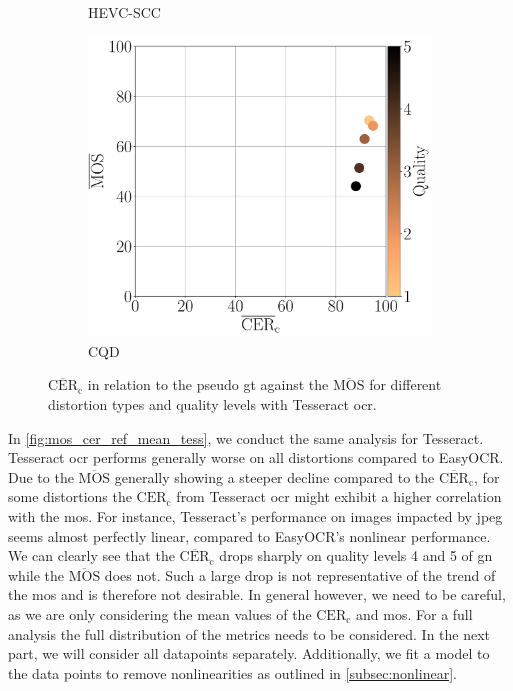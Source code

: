 \begin{figure}
\begin{subfigure}[b]{0.32\textwidth}
        \caption{HEVC-SCC}
        \label{fig:mos_cer_ref_mean_tess_HEVC-SCC}
    \end{subfigure}%
    \hfill
    \begin{subfigure}[b]{0.32\textwidth}
        \includegraphics[width=\textwidth]{../../images/analyze/mos_cer_ref_mean_tess_CQD.pdf}
        \caption{CQD}
        \label{fig:mos_cer_ref_mean_tess_CQD}
    \end{subfigure}%
    \caption{$\overline{\text{CER}}_{\text{c}}$ in relation to the pseudo \gls{gt} against the $\overline{\text{MOS}}$ for different distortion types and quality levels with Tesseract \gls{ocr}.}
\label{fig:mos_cer_ref_mean_tess}
\end{figure}
In \autoref{fig:mos_cer_ref_mean_tess}, we conduct the same analysis for Tesseract.
Tesseract \gls{ocr} performs generally worse on all distortions compared to EasyOCR.
Due to the $\overline{\text{MOS}}$ generally showing a steeper decline compared to the $\overline{\text{CER}}_{\text{c}}$, for some distortions the $\text{CER}_{\text{c}}$ from Tesseract \gls{ocr} might exhibit a higher correlation with the \gls{mos}.
For instance, Tesseract's performance on images impacted by \gls{jpeg} seems almost perfectly linear, compared to EasyOCR's nonlinear performance.
We can clearly see that the $\overline{\text{CER}}_{\text{c}}$ drops sharply on quality levels 4 and 5 of \gls{gn} while the $\overline{\text{MOS}}$ does not.
Such a large drop is not representative of the trend of the \gls{mos} and is therefore not desirable.
In general however, we need to be careful, as we are only considering the mean values of the $\text{CER}_{\text{c}}$ and \gls{mos}.
For a full analysis the full distribution of the metrics needs to be considered.
In the next part, we will consider all datapoints separately.
Additionally, we fit a model to the data points to remove nonlinearities as outlined in \autoref{subsec:nonlinear}.




